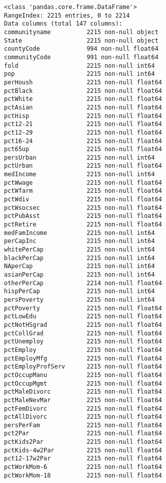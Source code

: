\documentclass[11pt]{llncs}
\begin{document}
    \begin{Verbatim}[commandchars=\\\{\}]
<class 'pandas.core.frame.DataFrame'>
RangeIndex: 2215 entries, 0 to 2214
Data columns (total 147 columns):
communityname          2215 non-null object
State                  2215 non-null object
countyCode             994 non-null float64
communityCode          991 non-null float64
fold                   2215 non-null int64
pop                    2215 non-null int64
perHoush               2215 non-null float64
pctBlack               2215 non-null float64
pctWhite               2215 non-null float64
pctAsian               2215 non-null float64
pctHisp                2215 non-null float64
pct12-21               2215 non-null float64
pct12-29               2215 non-null float64
pct16-24               2215 non-null float64
pct65up                2215 non-null float64
persUrban              2215 non-null int64
pctUrban               2215 non-null float64
medIncome              2215 non-null int64
pctWwage               2215 non-null float64
pctWfarm               2215 non-null float64
pctWdiv                2215 non-null float64
pctWsocsec             2215 non-null float64
pctPubAsst             2215 non-null float64
pctRetire              2215 non-null float64
medFamIncome           2215 non-null int64
perCapInc              2215 non-null int64
whitePerCap            2215 non-null int64
blackPerCap            2215 non-null int64
NAperCap               2215 non-null int64
asianPerCap            2215 non-null int64
otherPerCap            2214 non-null float64
hispPerCap             2215 non-null int64
persPoverty            2215 non-null int64
pctPoverty             2215 non-null float64
pctLowEdu              2215 non-null float64
pctNotHSgrad           2215 non-null float64
pctCollGrad            2215 non-null float64
pctUnemploy            2215 non-null float64
pctEmploy              2215 non-null float64
pctEmployMfg           2215 non-null float64
pctEmployProfServ      2215 non-null float64
pctOccupManu           2215 non-null float64
pctOccupMgmt           2215 non-null float64
pctMaleDivorc          2215 non-null float64
pctMaleNevMar          2215 non-null float64
pctFemDivorc           2215 non-null float64
pctAllDivorc           2215 non-null float64
persPerFam             2215 non-null float64
pct2Par                2215 non-null float64
pctKids2Par            2215 non-null float64
pctKids-4w2Par         2215 non-null float64
pct12-17w2Par          2215 non-null float64
pctWorkMom-6           2215 non-null float64
pctWorkMom-18          2215 non-null float64

\end{Verbatim}
\end{document}
